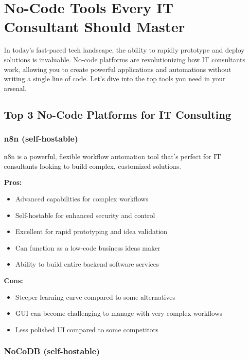 \chapter{No-Code Tools Every IT Consultant Should Master}



In today's fast-paced tech landscape, the ability to rapidly prototype and deploy solutions is invaluable. No-code platforms are revolutionizing how IT consultants work, allowing you to create powerful applications and automations without writing a single line of code. Let's dive into the top tools you need in your arsenal.

\section{Top 3 No-Code Platforms for IT Consulting}

\subsection{n8n (self-hostable)}

n8n is a powerful, flexible workflow automation tool that's perfect for IT consultants looking to build complex, customized solutions.

\textbf{Pros:}
\begin{itemize}
    \item Advanced capabilities for complex workflows
    \item Self-hostable for enhanced security and control
    \item Excellent for rapid prototyping and idea validation
    \item Can function as a low-code business ideas maker
    \item Ability to build entire backend software services
\end{itemize}

\textbf{Cons:}
\begin{itemize}
    \item Steeper learning curve compared to some alternatives
    \item GUI can become challenging to manage with very complex workflows
    \item Less polished UI compared to some competitors
\end{itemize}

\subsection{NoCoDB (self-hostable)}

